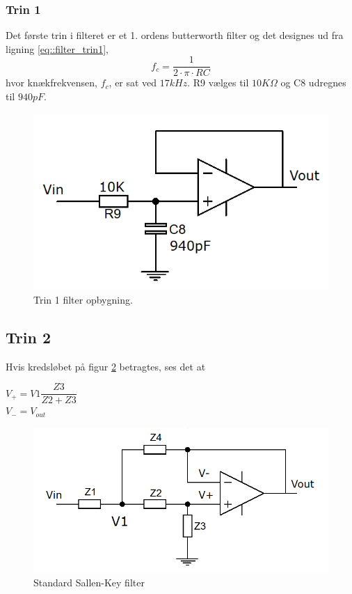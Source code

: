 \subsubsection{Trin 1} 
Det første trin i filteret er et 1. ordens butterworth filter og det designes ud fra ligning \ref{eq::filter_trin1},
\begin{equation}
	f_c = \dfrac{1}{2\cdot\pi\cdot R C} \label{eq::filter_trin1}
\end{equation} 	
hvor knækfrekvensen, $f_c$, er sat ved $17kHz$.
R9 vælges til $10K\Omega$ og C8 udregnes til $940pF$.
\begin{figure}[h!]
	\centering
	\includegraphics[scale=0.4]{./billeder/stage1a.png}
	\caption{Trin 1 filter opbygning.}
	\label{fig::stage1}
\end{figure}

\subsection{Trin 2}\label{sec::stage2}
Hvis kredsløbet på figur \ref{fig::anfilter_gensallen} betragtes, ses det at\\
\begin{center}
	$V_+ = V1\dfrac{Z3}{Z2+Z3}$\\
	\vspace*{5mm}
	$V_- = V_{out}$
\end{center}
\begin{figure}[h!]
	\centering
	\includegraphics[scale = 0.4]{./billeder/komp_udregn}
	\caption{Standard Sallen-Key filter}
	\label{fig::anfilter_gensallen}
\end{figure}
\FloatBlock


